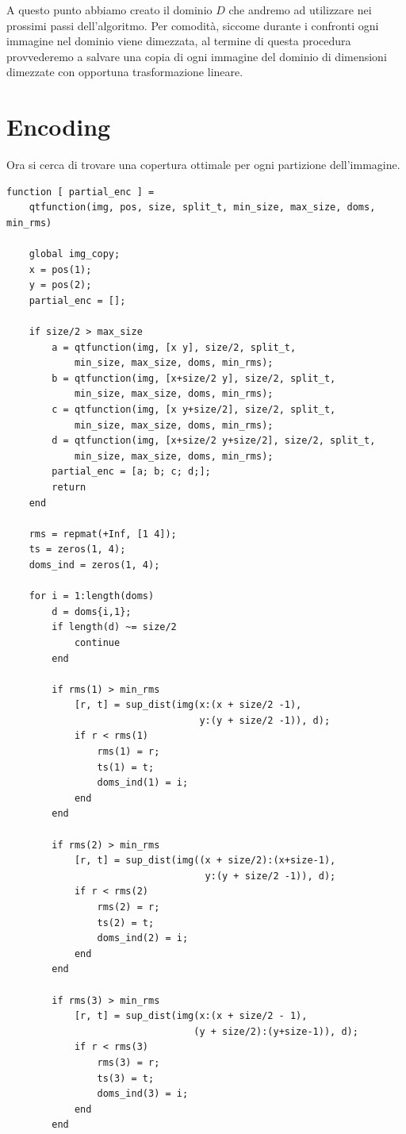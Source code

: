 \documentclass[11pt,a4paper,appendixprefix=true,numbers=noenddot]{scrreprt}
\begin{document}
A questo punto abbiamo creato il dominio $D$ che andremo ad utilizzare nei prossimi passi dell'algoritmo. Per comodità, siccome durante i confronti ogni immagine nel dominio viene dimezzata, al termine di questa procedura provvederemo a salvare una copia di ogni immagine del dominio di dimensioni dimezzate con opportuna trasformazione lineare.

\section{Encoding}

Ora si cerca di trovare una copertura ottimale per ogni partizione dell'immagine.

\begin{verbatim}
function [ partial_enc ] = 
    qtfunction(img, pos, size, split_t, min_size, max_size, doms, min_rms)

    global img_copy;
    x = pos(1);
    y = pos(2);
    partial_enc = [];

    if size/2 > max_size
        a = qtfunction(img, [x y], size/2, split_t, 
            min_size, max_size, doms, min_rms);
        b = qtfunction(img, [x+size/2 y], size/2, split_t, 
            min_size, max_size, doms, min_rms);
        c = qtfunction(img, [x y+size/2], size/2, split_t, 
            min_size, max_size, doms, min_rms);
        d = qtfunction(img, [x+size/2 y+size/2], size/2, split_t, 
            min_size, max_size, doms, min_rms);
        partial_enc = [a; b; c; d;];
        return
    end

    rms = repmat(+Inf, [1 4]);
    ts = zeros(1, 4);
    doms_ind = zeros(1, 4);

    for i = 1:length(doms)
        d = doms{i,1};
        if length(d) ~= size/2
            continue
        end
        
        if rms(1) > min_rms
            [r, t] = sup_dist(img(x:(x + size/2 -1), 
                                  y:(y + size/2 -1)), d);
            if r < rms(1)
                rms(1) = r;
                ts(1) = t;
                doms_ind(1) = i;
            end
        end
        
        if rms(2) > min_rms
            [r, t] = sup_dist(img((x + size/2):(x+size-1), 
                                   y:(y + size/2 -1)), d);
            if r < rms(2)
                rms(2) = r;
                ts(2) = t;
                doms_ind(2) = i;
            end
        end
        
        if rms(3) > min_rms
            [r, t] = sup_dist(img(x:(x + size/2 - 1), 
                                 (y + size/2):(y+size-1)), d);
            if r < rms(3)
                rms(3) = r;
                ts(3) = t;
                doms_ind(3) = i;
            end
        end
        

\end{verbatim}
\end{document}
